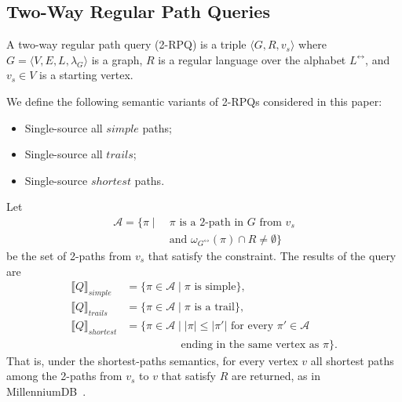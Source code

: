 \subsection{Two-Way Regular Path Queries}

\begin{definition}
	A two-way regular path query (2-RPQ) is a triple $\langle G, R, v_s \rangle$ where $G = \langle V, E, L, \lambda_G \rangle$ is a graph, $R$ is a regular language over the alphabet $L^\leftrightarrow$, and $v_s \in V$ is a starting vertex.
\end{definition}

We define the following semantic variants of 2-RPQs considered in this paper:
\begin{itemize}
  \item Single-source all $simple$ paths;
  \item Single-source all $trails$;
  \item Single-source $shortest$ paths.
\end{itemize}
Let
\begin{align*}
      \mathcal{A} = \{ \pi \mid \ & \pi \text{ is a 2-path in } G \text{ from } v_s \\
                                  & \text{and } \omega_{G^\leftrightarrow}(\pi) \cap R \neq \emptyset \}
\end{align*}
be the set of 2-paths from $v_s$ that satisfy the constraint. The results of the query are
\begin{align*}
      \llbracket Q \rrbracket_{simple}   &= \{ \pi \in \mathcal{A} \mid \pi \text{ is simple} \}, \\
      \llbracket Q \rrbracket_{trails}   &= \{ \pi \in \mathcal{A} \mid \pi \text{ is a trail} \}, \\
      \llbracket Q \rrbracket_{shortest} &= \{ \pi \in \mathcal{A} \mid |\pi| \leq |\pi'| \text{ for every } \pi' \in \mathcal{A} \\
                       &\qquad\qquad\quad \text{ending in the same vertex as } \pi \}.
\end{align*}
That is, under the shortest-paths semantics, for every vertex $v$ all shortest paths among the 2-paths from $v_s$ to $v$ that satisfy $R$ are returned, as in MillenniumDB~\cite{DBLP:journals/corr/abs-2204-11137,DBLP:conf/amw/FariasRV23}.
